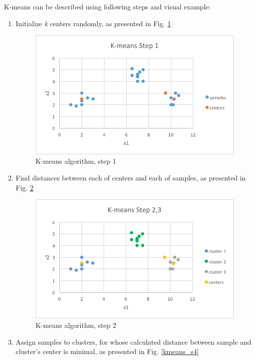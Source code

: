 	K-means can be described using following steps and visual example:
	\begin{enumerate}
	
	\item Initialize \textit{k} centers randomly, as presented in Fig. \ref{kmeans_s1}
	\begin{figure}[H]
	\begin{center}
	\includegraphics[width=0.8\linewidth]{images/kmeans1.png}
	\caption{K-means algorithm, step 1}
	\label{kmeans_s1}
	\end{center}
	\end{figure}
	
	\item Find distances between each of centers and each of samples, as presented in Fig. \ref{kmeans_s2}
	\begin{figure}[H]
	\begin{center}
	\includegraphics[width=0.8\linewidth]{images/kmeans2.png}
	\caption{K-means algorithm, step 2}
	\label{kmeans_s2}
	\end{center}
	\end{figure}
	
	\item Assign samples to clusters, for whose calculated distance between sample and cluster's center is minimal, as presented in Fig. \ref{kmeans_s4}
	

\end{enumerate}
